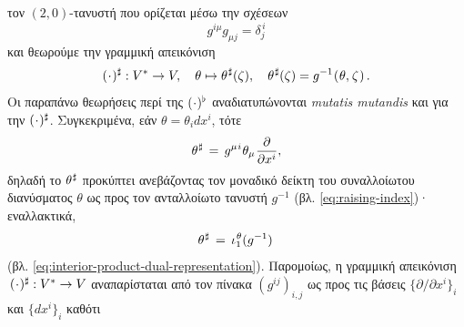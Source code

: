 \documentclass[11pt,a4paper,twoside,openright]{book}
\begin{document}
τον $(2,0)$-τανυστή που ορίζεται μέσω την σχέσεων
\begin{equation}
g^{i \mu} g_{\mu j} = \delta^{\,i}_{j}
\end{equation}
και θεωρούμε την γραμμική απεικόνιση
\begin{equation}\label{eq:sharp-elementary}
(\hspace{.5pt}\cdot\hspace{.5pt})^\sharp: V^* \to V,
\quad
\theta \mapsto \theta^{\hspace{.5pt}\sharp}(\zeta),
\quad
\theta^{\hspace{.5pt}\sharp}(\zeta) = g^{-1}\hspace{.5pt}(\hspace{.5pt}\theta,\hspace{.5pt}\zeta\hspace{.7pt})\,.
\end{equation}
Οι παραπάνω θεωρήσεις περί της $(\hspace{.5pt}\cdot\hspace{.5pt})^\flat$ αναδιατυπώνονται \textit{mutatis mutandis} και για την $(\hspace{.5pt}\cdot\hspace{.5pt})^\sharp$. Συγκεκριμένα,
εάν $\theta = \theta_i dx^i$, τότε
\begin{equation}\label{eq:sharp-elementary-as-raising}
\theta^{\hspace{.5pt}\sharp}
\,=\,
g^{\mu\hspace{.5pt}i}\hspace{.5pt}\theta_\mu\hspace{.5pt}\frac{\partial}{\partial x^i},
\end{equation}
δηλαδή το $\theta^{\hspace{.5pt}\sharp}$ προκύπτει ανεβάζοντας τον μοναδικό δείκτη του συναλλοίωτου διανύσματος $\theta$ ως προς τον ανταλλοίωτο τανυστή $g^{-1}$ (βλ. \eqref{eq:raising-index})· εναλλακτικά,
\begin{equation}\label{eq:sharp-as-interior-product}
\theta^{\hspace{.5pt}\sharp}\,=\,\iota_1^{\hspace{.5pt}\theta}(g^{-1})\,
\end{equation}
(βλ. \eqref{eq:interior-product-dual-representation}).
Παρομοίως, η γραμμική απεικόνιση $\,(\hspace{.5pt}\cdot\hspace{.5pt})^\sharp: V^* \to V$ αναπαρίσταται από τον πίνακα $(g^{ij})_{i,j}$ ως προς τις βάσεις $\{\partial/\partial x^i\}_i$ και $\{dx^i\}_i$ καθότι
\end{document}
